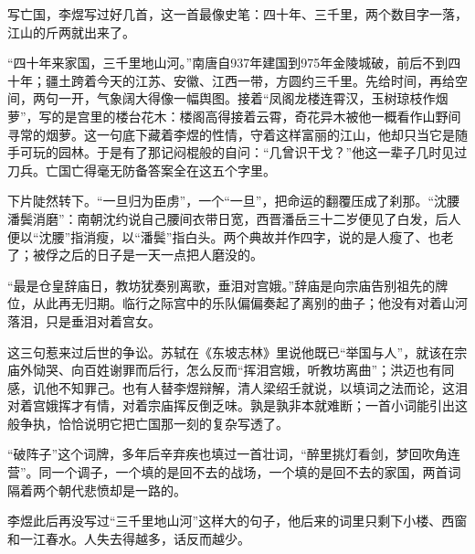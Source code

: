 \begin{appreciation}
写亡国，李煜写过好几首，这一首最像史笔：四十年、三千里，两个数目字一落，江山的斤两就出来了。

“四十年来家国，三千里地山河。”南唐自937年建国到975年金陵城破，前后不到四十年；疆土跨着今天的江苏、安徽、江西一带，方圆约三千里。先给时间，再给空间，两句一开，气象阔大得像一幅舆图。接着“凤阁龙楼连霄汉，玉树琼枝作烟萝”，写的是宫里的楼台花木：楼阁高得接着云霄，奇花异木被他一概看作山野间寻常的烟萝。这一句底下藏着李煜的性情，守着这样富丽的江山，他却只当它是随手可玩的园林。于是有了那记闷棍般的自问：“几曾识干戈？”他这一辈子几时见过刀兵。亡国亡得毫无防备答案全在这五个字里。

下片陡然转下。“一旦归为臣虏”，一个“一旦”，把命运的翻覆压成了刹那。“沈腰潘鬓消磨”：南朝沈约说自己腰间衣带日宽，西晋潘岳三十二岁便见了白发，后人便以“沈腰”指消瘦，以“潘鬓”指白头。两个典故并作四字，说的是人瘦了、也老了；被俘之后的日子是一天一点把人磨没的。

“最是仓皇辞庙日，教坊犹奏别离歌，垂泪对宫娥。”辞庙是向宗庙告别祖先的牌位，从此再无归期。临行之际宫中的乐队偏偏奏起了离别的曲子；他没有对着山河落泪，只是垂泪对着宫女。

这三句惹来过后世的争讼。苏轼在《东坡志林》里说他既已“举国与人”，就该在宗庙外恸哭、向百姓谢罪而后行，怎么反而“挥泪宫娥，听教坊离曲”；洪迈也有同感，讥他不知罪己。也有人替李煜辩解，清人梁绍壬就说，以填词之法而论，这泪对着宫娥挥才有情，对着宗庙挥反倒乏味。孰是孰非本就难断；一首小词能引出这般争执，恰恰说明它把亡国那一刻的复杂写透了。

“破阵子”这个词牌，多年后辛弃疾也填过一首壮词，“醉里挑灯看剑，梦回吹角连营”。同一个调子，一个填的是回不去的战场，一个填的是回不去的家国，两首词隔着两个朝代悲愤却是一路的。

李煜此后再没写过“三千里地山河”这样大的句子，他后来的词里只剩下小楼、西窗和一江春水。人失去得越多，话反而越少。
\end{appreciation}
